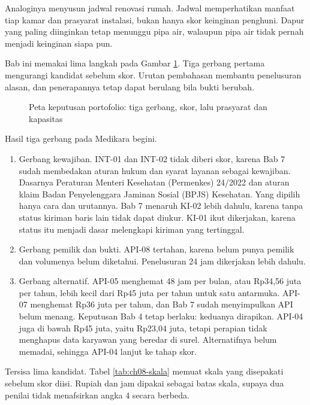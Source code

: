 Analoginya menyusun jadwal renovasi rumah. Jadwal memperhatikan manfaat tiap kamar dan prasyarat instalasi, bukan hanya skor keinginan
penghuni. Dapur yang paling diinginkan tetap menunggu pipa air, walaupun pipa air tidak pernah menjadi keinginan siapa pun.

Bab ini memakai lima langkah pada Gambar \ref{fig:ch08-keputusan}. Tiga gerbang pertama mengurangi kandidat sebelum skor. Urutan
pembahasan membantu penelusuran alasan, dan penerapannya tetap dapat berulang bila bukti berubah.

\begin{figure}[!htb]
  \centering
  
  \caption{Peta keputusan portofolio: tiga gerbang, skor, lalu prasyarat dan kapasitas}
  \label{fig:ch08-keputusan}
\end{figure}

Hasil tiga gerbang pada Medikara begini.
\begin{enumerate}
  \item Gerbang kewajiban. INT-01 dan INT-02 tidak diberi skor, karena Bab 7 sudah membedakan aturan hukum dan syarat layanan sebagai
        kewajiban. Dasarnya Peraturan Menteri Kesehatan (Permenkes) 24/2022 \cite{permenkes24-2022} dan aturan klaim Badan
        Penyelenggara Jaminan Sosial (BPJS) Kesehatan. Yang dipilih hanya cara dan urutannya. Bab 7 menaruh KI-02 lebih dahulu, karena
        tanpa status kiriman baris lain tidak dapat diukur. KI-01 ikut dikerjakan, karena status itu menjadi dasar melengkapi kiriman
        yang tertinggal.
  \item Gerbang pemilik dan bukti. API-08 tertahan, karena belum punya pemilik dan volumenya belum diketahui. Penelusuran 24 jam
        dikerjakan lebih dahulu.
  \item Gerbang alternatif. API-05 menghemat 48 jam per bulan, atau Rp34,56 juta per tahun, lebih kecil dari Rp45 juta per tahun untuk
        satu antarmuka. API-07 menghemat Rp36 juta per tahun, dan Bab 7 sudah menyimpulkan API belum menang. Keputusan Bab 4 tetap
        berlaku: keduanya dirapikan. API-04 juga di bawah Rp45 juta, yaitu Rp23,04 juta, tetapi perapian tidak menghapus data karyawan
        yang beredar di surel. Alternatifnya belum memadai, sehingga API-04 lanjut ke tahap skor.
\end{enumerate}

Tersisa lima kandidat. Tabel \ref{tab:ch08-skala} memuat skala yang disepakati sebelum skor diisi. Rupiah dan jam dipakai sebagai
batas skala, supaya dua penilai tidak menafsirkan angka 4 secara berbeda.

